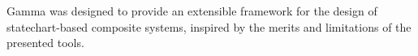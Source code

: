 Gamma was designed to provide an extensible framework for the design of statechart-based composite systems, inspired by the merits and limitations of the presented tools. 


%
%

